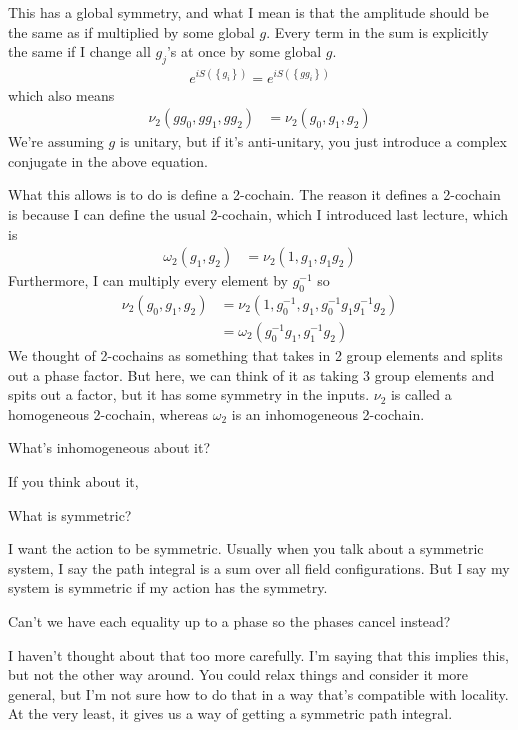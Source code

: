 This has a global symmetry,
and what I mean is that the amplitude should be the same as if multiplied by
some global $g$.
Every term in the sum is explicitly the same if I change all $g_j$'s at once by
some global $g$.
\begin{align}
    e^{iS\left( \left\{ g_i \right\} \right)}
    =
    e^{iS\left( \left\{ gg_i \right\} \right)}
\end{align}
which also means
\begin{align}
    \nu_2\left( gg_0, gg_1, gg_2 \right) &=
    \nu_2\left( g_0, g_1, g_2 \right)
\end{align}
We're assuming $g$ is unitary,
but if it's anti-unitary,
you just introduce a complex conjugate in the above equation.

What this allows is to do is define a 2-cochain.
The reason it defines a 2-cochain is because I can define the usual 2-cochain,
which I introduced last lecture,
which is
\begin{align}
    \omega_2(g_1, g_2) &=
    \nu_2 (1, g_1, g_1 g_2)
\end{align}
Furthermore,
I can multiply every element by $g_0^{-1}$ so
\begin{align}
    \nu_2 (g_0, g_1, g_2) &=
    \nu_2 \left( 
    1, g_0^{-1},g_1, g_{0}^{-1} g_1 g_1^{-1} g_2
    \right)\\
    &= \omega_2\left( g_0^{-1} g_1, g_1^{-1} g_2 \right)
\end{align}
We thought of 2-cochains as something that takes in 2 group elements and splits
out a phase factor.
But here,
we can think of it as taking 3 group elements and spits out a factor,
but it has some symmetry in the inputs.
$\nu_2$ is called a homogeneous 2-cochain,
whereas $\omega_2$ is an inhomogeneous 2-cochain.

\begin{question}
    What's inhomogeneous about it?
\end{question}
If you think about it,

\begin{question}
    What is symmetric?
\end{question}
I want the action to be symmetric.
Usually when you talk about a symmetric system,
I say the path integral is a sum over all field configurations.
But I say my system is symmetric if my action has the symmetry.

\begin{question}
    Can't we have each equality up to a phase
    so the phases cancel instead?
\end{question}
I haven't thought about that too more carefully.
I'm saying that this implies this,
but not the other way around.
You could relax things and consider it more general,
but I'm not sure how to do that in a way that's compatible with locality.
At the very least,
it gives us a way of getting a symmetric path integral.

